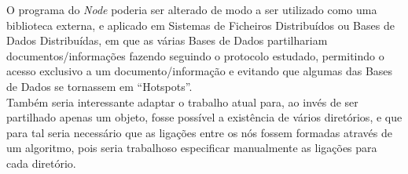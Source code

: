 O programa do \emph{Node} poderia ser alterado de modo a ser utilizado como 
uma biblioteca externa,
e aplicado em Sistemas de Ficheiros Distribuídos ou Bases de Dados Distribuídas,
em que as várias Bases de Dados partilhariam documentos/informações fazendo seguindo o protocolo estudado,
permitindo o acesso exclusivo a um documento/informação e evitando que algumas das Bases de Dados se tornassem em ``Hotspots''. \\

Também seria interessante adaptar o trabalho atual para, ao invés de ser partilhado apenas um objeto,
 fosse possível a existência de vários diretórios, 
e que para tal seria necessário que as ligações entre os nós fossem formadas através de um algoritmo,
pois seria trabalhoso especificar manualmente as ligações para cada diretório. \\

